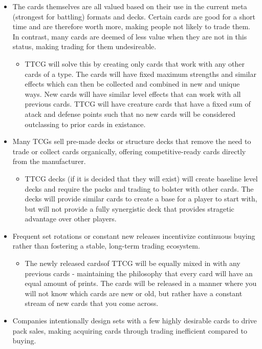 \begin{itemize}
  	\item The cards themselves are all valued based on their use in the current meta (strongest for battling) formats and decks. Certain cards are good for a short time and are therefore worth more, making people not likely to trade them. In contrast, many cards are deemed of less value when they are not in this status, making trading for them undesireable.
 	\begin{itemize}
		\item TTCG will solve this by creating only cards that work with any other cards of a type. The cards will have fixed maximum strengths and similar effects which can then be collected and combined in new and unique ways. New cards will have similar level effects that can work with all previous cards. TTCG will have creature cards that have a fixed sum of atack and defense points such that no new cards will be considered outclassing to prior cards in existance. 
  	\end{itemize}
	\item Many TCGs sell pre-made decks or structure decks that remove the need to trade or collect cards organically, offering competitive-ready cards directly from the manufacturer.
 	\begin{itemize}
		\item TTCG decks (if it is decided that they will exist) will create baseline level decks and require the packs and trading to bolster with other cards. The decks will provide similar cards to create a base for a player to start with, but will not provide a fully synergistic deck that provides stragetic advantage over other players. 
  	\end{itemize}
 	\item Frequent set rotations or constant new releases incentivize continuous buying rather than fostering a stable, long-term trading ecosystem.
 	\begin{itemize}
		\item The newly released cardsof TTCG will be equally mixed in with any previous cards - maintaining the philosophy that every card will have an equal amount of prints. The cards will be released in a manner where you will not know which cards are new or old, but rather have a constant stream of new cards that you come across.
  	\end{itemize}
  	\item Companies intentionally design sets with a few highly desirable cards to drive pack sales, making acquiring cards through trading inefficient compared to buying.

\end{itemize}

